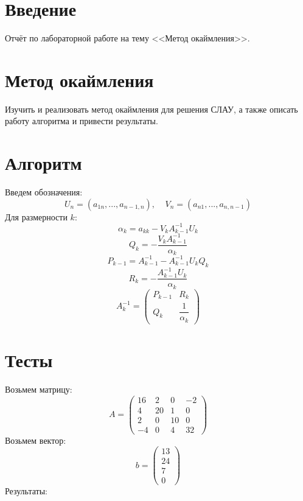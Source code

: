 \documentclass[14pt, titlepage,fleqn]{extarticle}
\begin{document}
	

	
	
	\newpage
	
	\tableofcontents   
	\clearpage
	\section*{Введение}
	Отчёт по лабораторной работе на тему <<Метод окаймления>>.	
	\newpage









	\section*{Метод окаймления}
	Изучить и реализовать метод окаймления для решения СЛАУ, а также описать работу алгоритма и
	привести результаты.

	\section*{Алгоритм}
	Введем обозначения:
	\[U_n = (a_{1n},...,a_{n-1,n}), ~~~~~ V_n =(a_{n1},...,a_{n,n-1})\]
	Для размерности $k$:
	\[\alpha_k = a_{kk} - V_kA^{-1}_{k-1}U_k\]
	\[Q_k = - \dfrac{V_kA^{-1}_{k-1}}{\alpha_k}\]
	\[P_{k-1} = A^{-1}_{k-1} - A^{-1}_{k-1}U_kQ_k\]
	\[R_k = - \dfrac{A^{-1}_{k-1}U_k}{\alpha_k}\]
	\[A^{-1}_k = \begin{pmatrix}
		P_{k-1} & R_k\\
		Q_k & \dfrac{1}{\alpha_k}
	\end{pmatrix}\]
	\newpage
	\section*{Тесты}
	Возьмем матрицу:
	\[A = \begin{pmatrix}
		16& 2& 0& -2\\
        4& 20& 1& 0\\
        2& 0& 10& 0\\
        -4& 0& 4& 32
	\end{pmatrix}\]
	Возьмем вектор:
	\[b =\begin{pmatrix}
		13\\
		24\\
		7\\
		0
	\end{pmatrix} \]
	Результаты:
	\begin{figure}[H]
	\end{figure}
\end{document}
